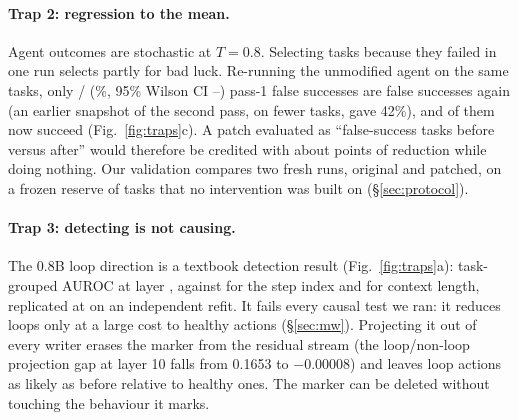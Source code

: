 \paragraph{Trap 2: regression to the mean.} Agent outcomes are stochastic at $T=0.8$. Selecting tasks because they failed in one run selects partly for bad luck. Re-running the unmodified agent on the same tasks, only \rtmFsAgain/\rtmFsN{} (\rtmFsAgainPct\%, 95\% Wilson CI \citep{wilson1927} \rtmFsAgainLo--\rtmFsAgainHi) pass-1 false successes are false successes again (an earlier snapshot of the second pass, on fewer tasks, gave 42\%), and \rtmFsSucc{} of them now succeed (Fig.~\ref{fig:traps}c). %
A patch evaluated as ``false-success tasks before versus after'' would therefore be credited with about \rtmFakeEffect{} points of reduction while doing nothing. Our validation compares two fresh runs, original and patched, on a frozen reserve of \ofReserveN{} tasks that no intervention was built on (\S\ref{sec:protocol}).

\paragraph{Trap 3: detecting is not causing.} The 0.8B loop direction is a textbook detection result (Fig.~\ref{fig:traps}a): task-grouped AUROC \mwAucBestExact{} at layer \mwAucBestLayer, against \mwAucStep{} for the step index and \mwAucCtx{} for context length, replicated at \mwAstraAuc{} on an independent refit. It fails every causal test we ran: it reduces loops only at a large cost to healthy actions (\S\ref{sec:mw}). Projecting it out of every writer erases the marker from the residual stream (the loop/non-loop projection gap at layer 10 falls from 0.1653 to $-0.00008$) and leaves loop actions as likely as before relative to healthy ones. %
The marker can be deleted without touching the behaviour it marks.

